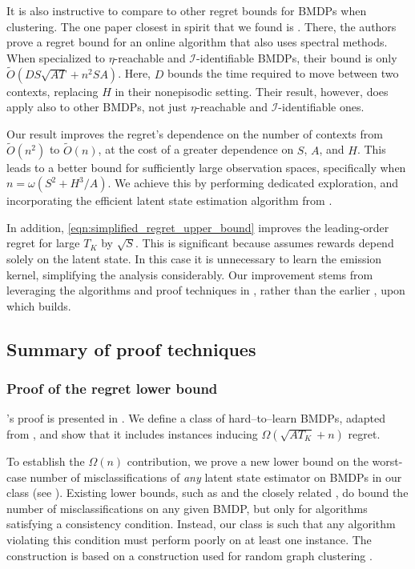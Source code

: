 \documentclass[11pt]{article}
\newcommand{\mcI}{\mathcal{I}}
\theoremstyle{definition}
\theoremstyle{definition}
\begin{document}
It is also instructive to compare  to other regret bounds for \glspl{BMDP} when clustering.
The one paper closest in spirit that we found is \cite{azizzadenesheli2016reinforcement}.
There, the authors prove a regret bound for an online algorithm that also uses spectral methods.
When specialized to $\eta$-reachable and $\mcI$-identifiable \glspl{BMDP}, their bound is only $\tilde{O}(DS\sqrt{AT}\allowbreak+\allowbreak n^2SA)$.
Here, $D$ bounds the time required to move between two contexts, replacing $H$ in their nonepisodic setting.
Their result, however, does apply also to other \glspl{BMDP}, not just $\eta$-reachable and $\mcI$-identifiable ones.

Our result improves the regret's dependence on the number of contexts from $\tilde{O}(n^2)$ to $\tilde{O}(n)$, at the cost of a greater dependence on $S$, $A$, and $H$.
This leads to a better bound for sufficiently large observation spaces, specifically when $n=\omega(S^2+H^3/A)$.
We achieve this by performing dedicated exploration, and incorporating the efficient latent state estimation algorithm from \cite{Jedra:2022}.

In addition, \eqref{eqn:simplified_regret_upper_bound} improves the leading-order regret for large $T_K$ by $\sqrt{S}$.
This is significant because \cite{azizzadenesheli2016reinforcement} assumes rewards depend solely on the latent state.
In this case it is unnecessary to learn the emission kernel, simplifying the analysis considerably.
Our improvement stems from leveraging the algorithms and proof techniques in \cite{UCRLVI}, rather than the earlier \cite{JMLR:v11:jaksch10a}, upon which \cite{azizzadenesheli2016reinforcement} builds.

\subsection{Summary of proof techniques}

\subsubsection{Proof of the regret lower bound}

's proof is presented in .
We define a class of hard--to--learn \glspl{BMDP}, adapted from \cite{Jedra:2022}, and show that it includes instances inducing $\Omega(\sqrt{AT_K}+n)$ regret.

To establish the $\Omega(n)$ contribution, we prove a new lower bound on the worst-case number of misclassifications of \textit{any} latent state estimator on \glspl{BMDP} in our class (see ).
Existing lower bounds, such as \cite[Theorem 1]{Jedra:2022} and the closely related \cite[Theorem 1]{Sanders:2020}, do bound the number of misclassifications on any given \gls{BMDP}, but only for algorithms satisfying a consistency condition.
Instead, our class is such that any algorithm violating this condition must perform poorly on at least one instance.
The construction is based on a construction used for random graph clustering \cite{zhang2016minimax}.
\end{document}
